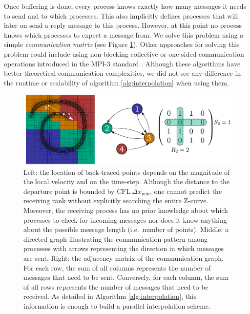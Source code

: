 Once buffering is done, every process knows exactly how many messages it needs to send and to which processes. This also implicitly defines processes that will later on send a reply message to this process. However, at this point no process knows which processes to expect a message from. We solve this problem using a simple \textit{communication matrix} (see Figure \ref{fig:communication}). Other approaches for solving this problem could include using non-blocking collective or one-sided communication operations introduced in the MPI-3 standard \cite{Hoefler;Siebert;Lumsdaine:10:Scalable-communication}. Although these algorithms have better theoretical communication complexities, we did not see any difference in the runtime or scalability of algorithm \ref{alg:interpolation} when using them. 

\begin{figure}[htbp]
\begin{center}
\includegraphics[width = \textwidth] {figures/communication.pdf}
\end{center}
\caption{Left: the location of back-traced points depends on the magnitude of the local velocity and on the time-step. Although the distance to the departure point is bounded by $\text{CFL} \: \Delta x_{\min}$, one cannot predict the receiving rank without explicitly searching the entire Z-curve. Moreover, the receiving process has no prior knowledge about which processes to check for incoming messages nor does it know anything about the possible message length (i.e.\ number of points). Middle: a directed graph illustrating the communication pattern among processes with arrows representing the direction in which messages are sent. Right: the adjacency matrix of the communication graph. For each row, the sum of all columns represents the number of messages that need to be sent. Conversely, for each column, the sum of all rows represents the number of messages that need to be received. As detailed in Algorithm \ref{alg:interpolation}, this information is enough to build a parallel interpolation scheme.}
\label{fig:communication}
\end{figure}

